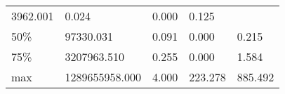 \documentclass[
  10pt,
  a4paper,
,tablecaptionabove
]{scrartcl}
\begin{document}
\begin{longtable}[]{@{}lllll@{}}
\begin{minipage}[t]{0.20\columnwidth}
3962.001\strut
\end{minipage} & \begin{minipage}[t]{0.13\columnwidth}\raggedright
0.024\strut
\end{minipage} & \begin{minipage}[t]{0.15\columnwidth}\raggedright
0.000\strut
\end{minipage} & \begin{minipage}[t]{0.15\columnwidth}\raggedright
0.125\strut
\end{minipage}\tabularnewline
\begin{minipage}[t]{0.11\columnwidth}\raggedright
50\%\strut
\end{minipage} & \begin{minipage}[t]{0.20\columnwidth}\raggedright
97330.031\strut
\end{minipage} & \begin{minipage}[t]{0.13\columnwidth}\raggedright
0.091\strut
\end{minipage} & \begin{minipage}[t]{0.15\columnwidth}\raggedright
0.000\strut
\end{minipage} & \begin{minipage}[t]{0.15\columnwidth}\raggedright
0.215\strut
\end{minipage}\tabularnewline
\begin{minipage}[t]{0.11\columnwidth}\raggedright
75\%\strut
\end{minipage} & \begin{minipage}[t]{0.20\columnwidth}\raggedright
3207963.510\strut
\end{minipage} & \begin{minipage}[t]{0.13\columnwidth}\raggedright
0.255\strut
\end{minipage} & \begin{minipage}[t]{0.15\columnwidth}\raggedright
0.000\strut
\end{minipage} & \begin{minipage}[t]{0.15\columnwidth}\raggedright
1.584\strut
\end{minipage}\tabularnewline
\begin{minipage}[t]{0.11\columnwidth}\raggedright
max\strut
\end{minipage} & \begin{minipage}[t]{0.20\columnwidth}\raggedright
1289655958.000\strut
\end{minipage} & \begin{minipage}[t]{0.13\columnwidth}\raggedright
4.000\strut
\end{minipage} & \begin{minipage}[t]{0.15\columnwidth}\raggedright
223.278\strut
\end{minipage} & \begin{minipage}[t]{0.15\columnwidth}\raggedright
885.492\strut
\end{minipage}\tabularnewline
\bottomrule
\end{longtable}
\end{document}
